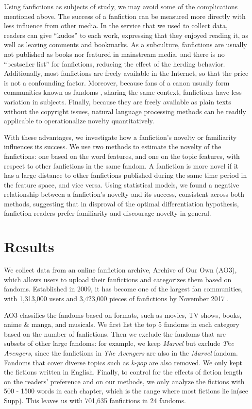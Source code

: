 \documentclass[a4paper]{article}
\begin{document}
Using fanfictions as subjects of study, we may avoid some of the complications mentioned above. The success of a fanfiction can be measured more directly with less influence from other media. In the service that we used to collect data, readers can give ``kudos'' to each work, expressing that they enjoyed reading it, as well as leaving comments and bookmarks. As a subculture, fanfictions are usually not published as books nor featured in mainstream media, and there is no ``bestseller list'' for fanfictions, reducing the effect of the herding behavior. Additionally, most fanfictions are freely available in the Internet, so that the price is not a confounding factor. Moreover, because fans of a canon usually form communities known as fandoms \cite{wiki:fandom}, sharing the same context, fanfictions have less variation in subjects. Finally, because they are freely available as plain texts without the copyright issues, natural language processing methods can be readily applicable to operationalize novelty quantitatively.

With these advantages, we investigate how a fanfiction's novelty or familiarity influences its success. We use two methods to estimate the novelty of the fanfictions: one based on the word features, and one on the topic features, with respect to other fanfictions in the same fandom. A fanfiction is more novel if it has a large distance to other fanfictions published during the same time period in the feature space, and vice versa. Using statistical models, we found a negative relationship between a fanfiction's novelty and its success, consistent across both methods, suggesting that in disproval of the optimal differentiation hypothesis, fanfiction readers prefer familiarity and discourage novelty in general.


\section*{Results} 
We collect data from an online fanfiction archive, Archive of Our Own (AO3), which allows users to upload their fanfictions and categorizes them based on fandoms. Established in 2009, it has become one of the largest fan communities, with 1,313,000 users and 3,423,000 pieces of fanfictions by November 2017 \cite{ao3stats}.

AO3 classifies the fandoms based on formats, such as movies, TV shows, books, anime \& manga, and musicals. We first list the top 5 fandoms in each category based on the number of fanfictions. Then we exclude the fandoms that are subsets of other large fandoms: for example, we keep \emph{Marvel} but exclude \emph{The Avengers}, since the fanfictions in \emph{The Avengers} are also in the \emph{Marvel} fandom. Fandoms that cover diverse topics such as \emph{k-pop} are also removed. We only kept the fictions written in English. Finally, to control for the effects of fiction length on the readers' preference and on our methods, we only analyze the fictions with 500 - 1500 words in each chapter, which is the range where most fictions lie in(see Supp). This leaves us with 701,635 fanfictions in 24 fandoms. 
\end{document}
